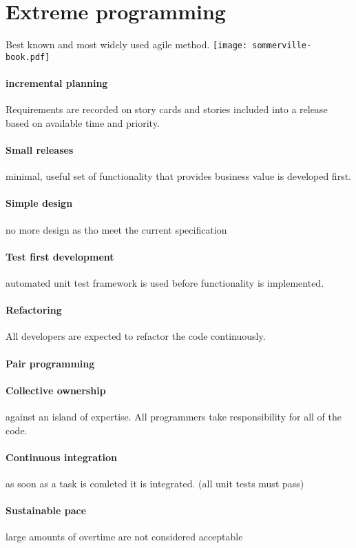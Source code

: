 \documentclass[a4paper,11pt,twocolumn]{report}
\begin{document}
    \section{Extreme programming}
    Best known and most widely used agile method. 
    \texttt{[image: sommerville-book.pdf]}
    \paragraph{incremental planning} Requirements are recorded on story cards
    and stories included into a release based on available time and priority.
    \paragraph{Small releases} minimal, useful set of functionality that
    provides business value is developed first.
    \paragraph{Simple design} no more design as tho meet the current
    specification
    \paragraph{Test first development} automated unit test framework is used
    before functionality is implemented.
    \paragraph{Refactoring} All developers are expected to refactor the code
    continuously.
    \paragraph{Pair programming}
    \paragraph{Collective ownership} against an island of expertise. All
    programmers take responsibility for all of the code.
    \paragraph{Continuous integration} as soon as a task is comleted it is
    integrated. (all unit tests must pass)
    \paragraph{Sustainable pace}large amounts of overtime are not considered
    acceptable
\end{document}
